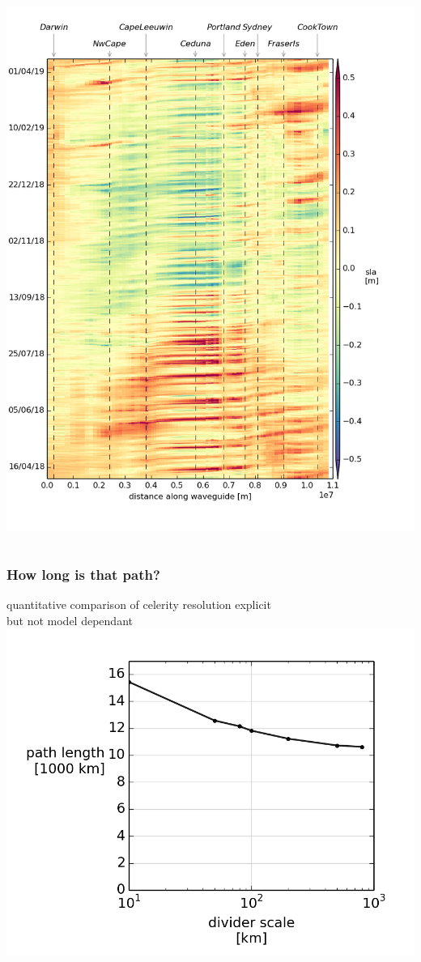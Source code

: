 \begin{frame}
\begin{columns}
    \begin{column}{0.5\textwidth}
        \includegraphics[width=\textwidth]{figures/plots/concat_sla_day0_full.png}
    \end{column}
\end{columns}
\end{frame}
\begin{frame}
\frametitle{How long is that path?}
    quantitative comparison of celerity
    resolution explicit\\
    but not model dependant
    \includegraphics[height=0.6\textheight]{figures/plots/mandelbrot_lengths.png}
\end{frame}
